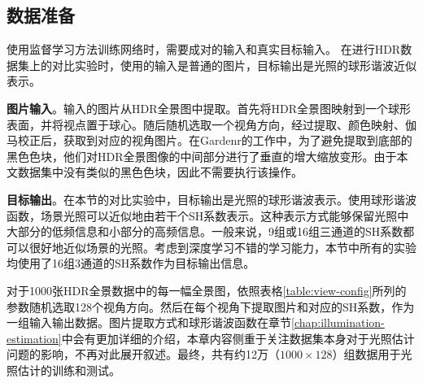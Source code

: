 \subsection{数据准备}
使用监督学习方法训练网络时，需要成对的输入和真实目标输入。
在进行HDR数据集上的对比实验时，使用的输入是普通的图片，目标输出是光照的球形谐波近似表示。

\textbf{图片输入}。输入的图片从HDR全景图中提取。首先将HDR全景图映射到一个球形表面，并将视点置于球心。随后随机选取一个视角方向，经过提取、颜色映射、伽马校正后，获取到对应的视角图片。在Gardenr\cite{gardner2017learning}的工作中，为了避免提取到底部的黑色色块，他们对HDR全景图像的中间部分进行了垂直的增大缩放变形。由于本文数据集中没有类似的黑色色块，因此不需要执行该操作。

\textbf{目标输出}。在本节的对比实验中，目标输出是光照的球形谐波表示。使用球形谐波函数，场景光照可以近似地由若干个SH系数表示。这种表示方式能够保留光照中大部分的低频信息和小部分的高频信息。一般来说，9组或16组三通道的SH系数都可以很好地近似场景的光照。考虑到深度学习不错的学习能力，本节中所有的实验均使用了16组3通道的SH系数作为目标输出信息。


对于1000张HDR全景数据中的每一幅全景图，依照表格\ref{table:view-config}所列的参数随机选取128个视角方向。然后在每个视角下提取图片和对应的SH系数，作为一组输入输出数据。图片提取方式和球形谐波函数在章节\ref{chap:illumination-estimation}中会有更加详细的介绍，本章内容侧重于关注数据集本身对于光照估计问题的影响，不再对此展开叙述。最终，共有约12万（$1000\times128$）组数据用于光照估计的训练和测试。

